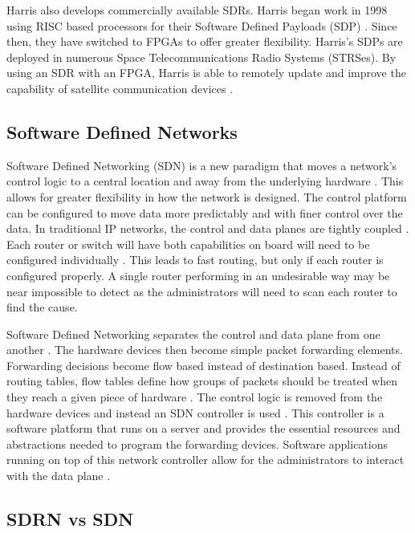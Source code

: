 Harris also develops commercially available SDRs. Harris began work in 1998 using RISC based processors for their Software Defined Payloads (SDP) \cite{5747366}. Since then, they have switched to FPGAs to offer greater flexibility. Harris's SDPs are deployed in numerous Space Telecommunications Radio Systems (STRSes). By using an SDR with an FPGA, Harris is able to remotely update and improve the capability of satellite communication devices \cite{5747366}. 

\subsection{Software Defined Networks}

Software Defined Networking (SDN) is a new paradigm that moves a network's control logic to a central location and away from the underlying hardware \cite{6994333}. This allows for greater flexibility in how the network is designed. The control platform can be configured to move data more predictably and with finer control over the data. In traditional IP networks, the control and data planes are tightly coupled \cite{6994333}. Each router or switch will have both capabilities on board will need to be configured individually \cite{7179430}. This leads to fast routing, but only if each router is configured properly. A single router performing in an undesirable way may be near impossible to detect as the administrators will need to scan each router to find the cause. 

Software Defined Networking separates the control and data plane from one another \cite{6994333}. The hardware devices then become simple packet forwarding elements. Forwarding decisions become flow based instead of destination based. Instead of routing tables, flow tables define how groups of packets should be treated when they reach a given piece of hardware \cite{7179430}. The control logic is removed from the hardware devices and instead an SDN controller is used \cite{6994333}. This controller is a software platform that runs on a server and provides the essential resources and abstractions needed to program the forwarding devices. Software applications running on top of this network controller allow for the administrators to interact with the data plane \cite{7452335}. 

\subsection{SDRN vs SDN}

